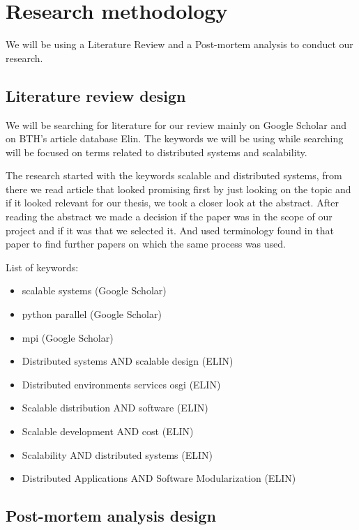 \documentclass{article}
\begin{document}
\section{Research methodology}

We will be using a Literature Review and a Post-mortem analysis to conduct our 
research. 

\subsection{Literature review design}

We will be searching for literature for our review mainly on Google Scholar and
on BTH's article database Elin. The keywords we will be using while searching 
will be focused on terms related to distributed systems and scalability.

The research started with the keywords scalable and distributed systems,
from there we read article that looked promising first by just looking on
the topic and if it looked relevant for our thesis, we took a closer look
at the abstract. After reading the abstract we made a decision if the paper
was in the scope of our project and if it was that we selected it. And used
terminology found in that paper to find further papers on which the same 
process was used. 
\newline

List of keywords:
\begin{itemize}
\item{scalable systems (Google Scholar)}
\item{python parallel (Google Scholar)}
\item{mpi (Google Scholar)}
\item{Distributed systems AND scalable design (ELIN)}
\item{Distributed environments services osgi (ELIN)}
\item{Scalable distribution AND software (ELIN)}
\item{Scalable development AND cost (ELIN)}
\item{Scalability AND distributed systems (ELIN)}
\item{Distributed Applications AND Software Modularization (ELIN)}
\end{itemize}

\subsection{Post-mortem analysis design}
\end{document}
